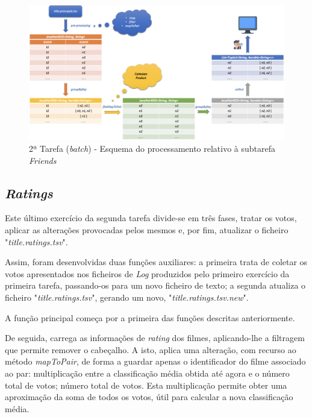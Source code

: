 \documentclass[a4paper]{report}
\begin{document}
            \begin{figure}[H]
                \centering
                \includegraphics[width=1.0\textwidth]{Images/Task 2 - Friends.png}
                \caption{2ª Tarefa (\textit{batch}) - Esquema do processamento relativo à subtarefa \textit{Friends}}
                \label{fig:18}
            \end{figure}

        \subsection{\textit{Ratings}} \label{subsec:Task2-Ratings}
            Este último exercício da segunda tarefa divide-se em três fases, tratar os votos, aplicar as alterações provocadas pelos mesmos e, por fim, atualizar o ficheiro "\textsl{title.ratings.tsv}".

            Assim, foram desenvolvidas duas funções auxiliares: 
            a primeira trata de coletar os votos apresentados nos ficheiros de \textit{Log} produzidos pelo primeiro exercício da primeira tarefa, passando-os para um novo ficheiro de texto; 
            a segunda atualiza o ficheiro "\textsl{title.ratings.tsv}", gerando um novo, "\textsl{title.ratings.tsv.new}".

            A função principal começa por a primeira das funções descritas anteriormente.

            De seguida, carrega as informações de \textit{rating} dos filmes, aplicando-lhe a filtragem que permite remover o cabeçalho.
            A isto, aplica uma alteração, com recurso ao método \textit{mapToPair}, de forma a guardar apenas o identificador do filme associado ao par: multiplicação entre a classificação média obtida até agora e o número total de votos; número total de votos.
            Esta multiplicação permite obter uma aproximação da soma de todos os votos, útil para calcular a nova classificação média.
\end{document}
